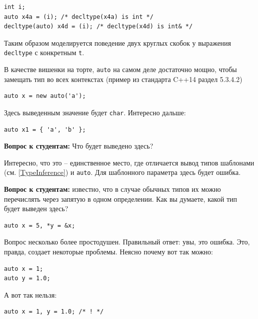 \documentclass[a4paper,12pt,oneside]{article}
\newif\ifanswers
\begin{document}
\begin{lstlisting}
int i;
auto x4a = (i); /* decltype(x4a) is int */
decltype(auto) x4d = (i); /* decltype(x4d) is int& */
\end{lstlisting}

Таким образом моделируется поведение двух круглых скобок у выражения \lstinline!decltype! с конкретным \lstinline!t!.

В качестве вишенки на торте, \lstinline!auto! на самом деле достаточно мощно, чтобы замещать тип во всех контекстах (пример из стандарта C++14 раздел 5.3.4.2)

\begin{lstlisting}
auto x = new auto('a');
\end{lstlisting}

Здесь выведенным значение будет \lstinline!char!. Интересно дальше:

\begin{lstlisting}
auto x1 = { 'a', 'b' };
\end{lstlisting}

\textbf{Вопрос к студентам:} Что будет выведено здесь? 

\ifanswers
Это довольно хитрый вопрос. Ответ ``массив'' неверный. В реальности будет выведен \lstinline!std::initializer_list<char>! -- тот самый новый тип, который позволил так лихо инициализировать вектор в самом начале.
\fi

Интересно, что это -- единственное место, где отличается вывод типов шаблонами (см. \ref{TypeInference}) и \lstinline!auto!. Для шаблонного параметра здесь будет ошибка.

\textbf{Вопрос к студентам:} известно, что в случае обычных типов их можно перечислять через запятую в одном определении. Как вы думаете, какой тип будет выведен здесь?

\begin{lstlisting}
auto x = 5, *y = &x;
\end{lstlisting}

\ifanswers
Вопрос несколько более простодушен. Правильный ответ: увы, это ошибка. Это, правда, создает некоторые проблемы. Неясно почему вот так можно:

\begin{lstlisting}
auto x = 1; 
auto y = 1.0;
\end{lstlisting}

А вот так нельзя:

\begin{lstlisting}
auto x = 1, y = 1.0; /* ! */
\end{lstlisting}
\end{document}
